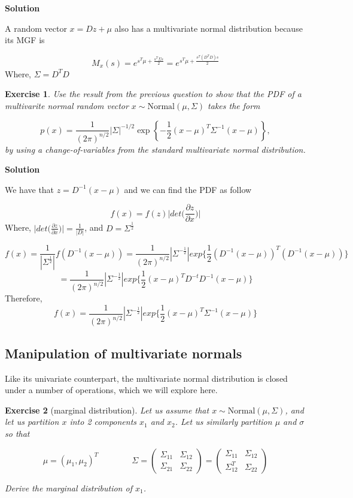 \documentclass[twoside]{article}
\newcounter{lecnum}
\newtheorem{exercise}{Exercise}[lecnum]
\begin{document}
\color{blue}
\textbf{Solution}

A random vector $x = Dz + \mu$ also has a multivariate normal distribution because its MGF is

$$ M_x(s)=e^{s^T\mu+\frac{s^T\Sigma s}{2}} =
e^{s^T\mu+\frac{s^T(D^TD)s}{2}} $$
Where, $\Sigma = D^TD$
\color{black}



\begin{exercise}
  Use the result from the previous question to show that the PDF of a multivarite normal random vector $x\sim\mbox{Normal}(\mu, \Sigma)$ takes the form

  $$p(x) = \frac{1}{(2\pi)^{n/2}}|\Sigma|^{-1/2}\exp\left\{-\frac{1}{2}(x-\mu)^T\Sigma^{-1}(x-\mu)\right\},$$
by using a change-of-variables from the standard multivariate normal distribution.
\end{exercise}


\color{blue}
\textbf{Solution}

We have that $z=D^{-1}(x-\mu)$ and we can find the PDF as follow

$$f(x) = f(z) \bigg| det\bigg(\frac{\partial{z}}{ \partial{x}} \bigg) \bigg|$$ 
Where, $ \bigg| det\bigg(\frac{\partial{z}}{ \partial{x}} \bigg) \bigg| = \frac{1}{|D|} $, and $D=\Sigma^{\frac{1}{2}} $

$$ f(x) = \frac{1}{|\Sigma^{\frac{1}{2}}|} f(D^{-1}(x-\mu)) = \frac{1}{(2 \pi)^{n/2} } |\Sigma^{-\frac{1}{2}}| exp\bigg\{\frac{1}{2}(D^{-1}(x-\mu))^T (D^{-1}(x-\mu))\bigg\}$$
$$  = \frac{1}{(2 \pi)^{n/2} } |\Sigma^{-\frac{1}{2}}| exp\bigg\{\frac{1}{2}(x-\mu)^T D^{-t}D^{-1} (x-\mu)\bigg\} $$
Therefore, 
$$ f(x) = \frac{1}{(2 \pi)^{n/2} } |\Sigma^{-\frac{1}{2}}| exp\bigg\{\frac{1}{2}(x-\mu)^T \Sigma^{-1} (x-\mu)\bigg\} $$


\color{black}
\subsection{Manipulation of multivariate normals}
Like its univariate counterpart, the multivariate normal distribution is closed under a number of operations, which we will explore here.

\begin{exercise}[marginal distribution]
  Let us assume that $x\sim \mbox{Normal}(\mu, \Sigma)$, and let us partition $x$ into 2 components $x_1$ and $x_2$. Let us similarly partition $\mu$ and $\sigma$ so that

  $$\mu  = (\mu_1, \mu_2)^T \qquad \qquad \Sigma = \begin{pmatrix}\Sigma_{11} & \Sigma_{12} \\ \Sigma_{21} & \Sigma_{22}\end{pmatrix} = \begin{pmatrix}\Sigma_{11} & \Sigma_{12} \\ \Sigma_{12}^T & \Sigma_{22}\end{pmatrix}$$

  Derive the marginal distribution of $x_1$.
\end{exercise}
\end{document}
